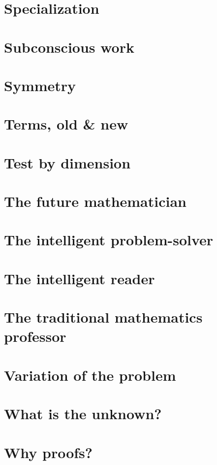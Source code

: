 \documentclass[oneside]{book}
\numberwithin{equation}{section}
\begin{document}
\section{Specialization}

\section{Subconscious work}

\section{Symmetry}

\section{Terms, old \& new}

\section{Test by dimension}

\section{The future mathematician}

\section{The intelligent problem-solver}

\section{The intelligent reader}

\section{The traditional mathematics professor}

\section{Variation of the problem}

\section{What is the unknown?}

\section{Why proofs?}
\end{document}
